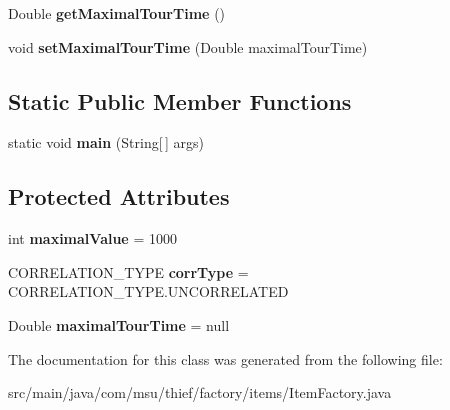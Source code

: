 \begin{DoxyCompactItemize}
\item 
\hypertarget{classcom_1_1msu_1_1thief_1_1factory_1_1items_1_1ItemFactory_a8c6da35ca46677994b27e09a1eb49da7}{Double {\bfseries get\-Maximal\-Tour\-Time} ()}\label{classcom_1_1msu_1_1thief_1_1factory_1_1items_1_1ItemFactory_a8c6da35ca46677994b27e09a1eb49da7}

\item 
\hypertarget{classcom_1_1msu_1_1thief_1_1factory_1_1items_1_1ItemFactory_ac31050b1978a7211a43e0c17e1db6663}{void {\bfseries set\-Maximal\-Tour\-Time} (Double maximal\-Tour\-Time)}\label{classcom_1_1msu_1_1thief_1_1factory_1_1items_1_1ItemFactory_ac31050b1978a7211a43e0c17e1db6663}

\end{DoxyCompactItemize}
\subsection*{Static Public Member Functions}
\begin{DoxyCompactItemize}
\item 
\hypertarget{classcom_1_1msu_1_1thief_1_1factory_1_1items_1_1ItemFactory_a36bb709de2fe69d57b53744addac09c2}{static void {\bfseries main} (String\mbox{[}$\,$\mbox{]} args)}\label{classcom_1_1msu_1_1thief_1_1factory_1_1items_1_1ItemFactory_a36bb709de2fe69d57b53744addac09c2}

\end{DoxyCompactItemize}
\subsection*{Protected Attributes}
\begin{DoxyCompactItemize}
\item 
\hypertarget{classcom_1_1msu_1_1thief_1_1factory_1_1items_1_1ItemFactory_a34629798e69390022e74f057fee39b57}{int {\bfseries maximal\-Value} = 1000}\label{classcom_1_1msu_1_1thief_1_1factory_1_1items_1_1ItemFactory_a34629798e69390022e74f057fee39b57}

\item 
\hypertarget{classcom_1_1msu_1_1thief_1_1factory_1_1items_1_1ItemFactory_a042798537b4713fd0fd18a76182d3b50}{C\-O\-R\-R\-E\-L\-A\-T\-I\-O\-N\-\_\-\-T\-Y\-P\-E {\bfseries corr\-Type} = C\-O\-R\-R\-E\-L\-A\-T\-I\-O\-N\-\_\-\-T\-Y\-P\-E.\-U\-N\-C\-O\-R\-R\-E\-L\-A\-T\-E\-D}\label{classcom_1_1msu_1_1thief_1_1factory_1_1items_1_1ItemFactory_a042798537b4713fd0fd18a76182d3b50}

\item 
\hypertarget{classcom_1_1msu_1_1thief_1_1factory_1_1items_1_1ItemFactory_adabff26a1dfbc7af247d140832c75ca7}{Double {\bfseries maximal\-Tour\-Time} = null}\label{classcom_1_1msu_1_1thief_1_1factory_1_1items_1_1ItemFactory_adabff26a1dfbc7af247d140832c75ca7}

\end{DoxyCompactItemize}


The documentation for this class was generated from the following file\-:\begin{DoxyCompactItemize}
\item 
src/main/java/com/msu/thief/factory/items/Item\-Factory.\-java\end{DoxyCompactItemize}
